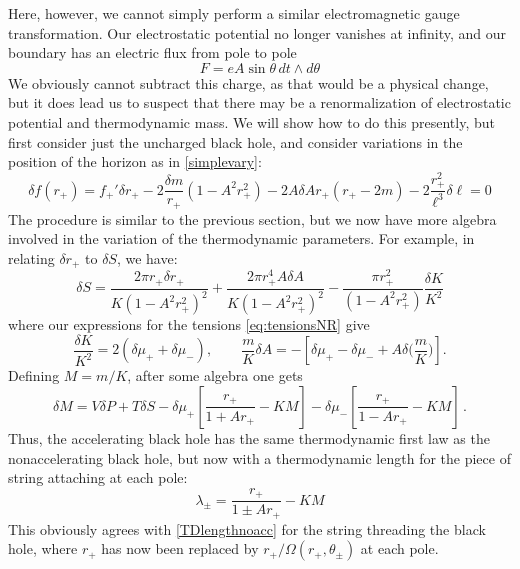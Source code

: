 \documentclass[
twoside,
openright,
frontopenright,
]{dmathesis}
\begin{document}
Here, however, we cannot simply perform a similar electromagnetic
gauge transformation. Our electrostatic potential no longer
vanishes at infinity, and our boundary has an electric flux from pole to pole
\begin{equation}
F = eA \sin\theta \, dt \wedge d\theta
\end{equation}
We obviously cannot subtract this charge, as that would be a physical change,
but it does lead us to suspect that there may be a renormalization of
electrostatic potential and thermodynamic mass. We will show how to do this
presently, but first consider just the uncharged black hole, and consider
variations in the position of the horizon as in \cref{simplevary}:
\begin{equation}
\delta f(r_+) = f_+' \delta r_+  - 2 \frac{\delta m}{r_+} (1-A^2r_+^2)
- 2 A \delta A r_+ (r_+ - 2m) - 2 \frac{r_+^2}{\ell^3} \delta \ell = 0
\end{equation}
The procedure is similar to the previous section, but we now have
more algebra involved in the variation of the thermodynamic parameters.
For example, in relating $\delta r_+$ to $\delta S$, we have:
\begin{equation}
\delta S = \frac{2\pi r_+ \delta r_+}{K(1-A^2 r_+^2)^2} + 
\frac{2 \pi r_+^4 A\delta A}{K (1-A^2 r_+^2)^2} - 
\frac{\pi r_+^2}{(1-A^2 r_+^2)} \frac{\delta K}{K^2}
\end{equation}
where our expressions for the tensions \cref{eq:tensionsNR} give
\begin{equation}
\frac{\delta K}{K^2} = 2 \left ( \delta \mu_+ + \delta \mu_- \right ), \qquad \frac{m}{K} \delta A = - \left [
\delta \mu_+ - \delta \mu_- + A \delta \Big(\frac{m}{K}\Big) \right].
\end{equation}
Defining $M=m/K$, after some algebra one gets
\begin{equation}
\delta M = V\delta P + T \delta S -
\delta \mu_+ \left [ \frac{r_+}{1+Ar_+} - KM \right ] -
\delta \mu_- \left [ \frac{r_+}{1-Ar_+} - KM \right ] \,.
\label{firstaccm}
\end{equation}
Thus, the accelerating black hole has the same thermodynamic first law
as the nonaccelerating black hole, but now with a thermodynamic length
for the piece of string attaching at each pole:
\begin{equation}
\lambda_\pm = \frac{r_+}{1 \pm Ar_+} - KM
\end{equation}
This obviously agrees with \cref{TDlengthnoacc} for the string
threading the black hole, where $r_+$ has now been replaced by
$r_+/\Omega(r_+,\theta_\pm)$ at each pole.
\end{document}
